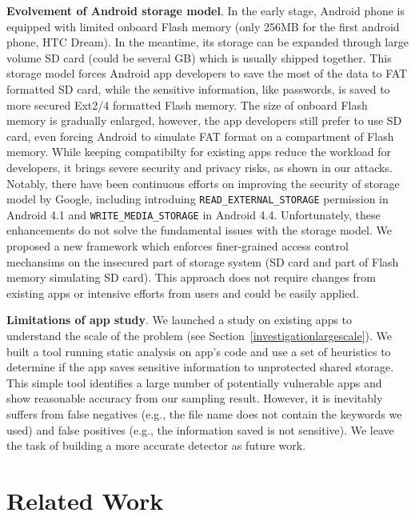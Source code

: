 \documentclass{sig-alternate}
\begin{document}
\vspace{2pt}\noindent\textbf{Evolvement of Android storage model}. In the early stage, Android phone is equipped with limited onboard Flash memory (only 256MB for the first android phone, HTC Dream). In the meantime, its storage can be expanded through large volume SD card (could be several GB) which is usually shipped together. This storage model forces Android app developers to save the most of the data to FAT formatted SD card, while the sensitive information, like passwords, is saved to more secured Ext2/4 formatted Flash memory. The size of onboard Flash memory is gradually enlarged, however, the app developers still prefer to use SD card, even forcing Android to simulate FAT format on a compartment of Flash memory. While keeping compatibilty for existing apps reduce the workload for developers, it brings severe security and privacy risks, as shown in our attacks. Notably, there have been continuous efforts on improving the security of storage model by Google, including introduing \texttt{READ\_EXTERNAL\_STORAGE} permission in Android 4.1 and \texttt{WRITE\_MEDIA\_STORAGE} in Android 4.4. Unfortunately, these enhancements do not solve the fundamental issues with the storage model. We proposed a new framework which enforces finer-grained access control mechansims on the insecured part of storage system (SD card and part of Flash memory simulating SD card). This approach does not require changes from existing apps or intensive efforts from users and could be easily applied.



\vspace{2pt}\noindent\textbf{Limitations of app study}. We launched a study on existing apps to understand the scale of the problem (see Section~\ref{investigationlargescale}). We built a tool running static analysis on app's code and use a set of heuristics to determine if the app saves sensitive information to unprotected shared storage. This simple tool identifies a large number of potentially vulnerable apps and show reasonable accuracy from our sampling result. However, it is inevitably suffers from false negatives (e.g., the file name does not contain the keywords we used) and false positives (e.g., the information saved is not sensitive). We leave the task of building a more accurate detector as future work.




\section{Related Work}
\label{sec:relatedWork}
\end{document}
